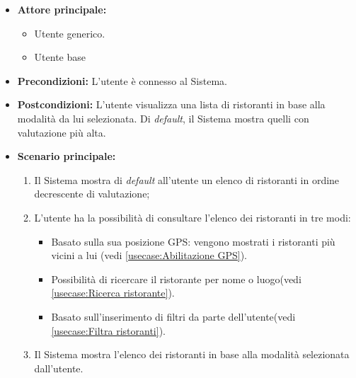 \label{usecase:Consultazione elenco ristoranti}
\begin{itemize}
	\item \textbf{Attore principale:} 
    \begin{itemize}
        \item Utente generico.
        \item Utente base
    \end{itemize}

	\item \textbf{Precondizioni:}
	      L'utente è connesso al Sistema.

	\item \textbf{Postcondizioni:} L'utente visualizza una lista di ristoranti in base alla modalità da lui selezionata.
    Di \textit{default}, il Sistema mostra quelli con valutazione più alta.

	\item \textbf{Scenario principale:}
	      \begin{enumerate}
              \item Il Sistema mostra di \textit{default} all'utente un elenco di ristoranti in ordine decrescente di valutazione;
              
		      \item L'utente ha la possibilità di consultare l'elenco dei ristoranti in tre modi:
		      \begin{itemize}
                \item Basato sulla sua posizione GPS: vengono mostrati i ristoranti più vicini a lui (vedi \autoref{usecase:Abilitazione GPS}).
                \item Possibilità di ricercare il ristorante per nome o luogo(vedi \autoref{usecase:Ricerca ristorante}).
                \item Basato sull'inserimento di filtri da parte dell'utente(vedi \autoref{usecase:Filtra ristoranti}).
              \end{itemize}

		      \item Il Sistema mostra l'elenco dei ristoranti in base alla modalità selezionata dall'utente.
		    
	      \end{enumerate}
\end{itemize}

